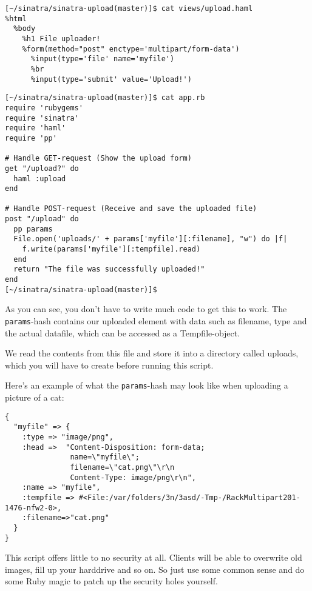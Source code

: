 \begin{verbatim}
[~/sinatra/sinatra-upload(master)]$ cat views/upload.haml 
%html
  %body
    %h1 File uploader!
    %form(method="post" enctype='multipart/form-data')   
      %input(type='file' name='myfile')    
      %br
      %input(type='submit' value='Upload!')
\end{verbatim}

\begin{verbatim}
[~/sinatra/sinatra-upload(master)]$ cat app.rb 
require 'rubygems'
require 'sinatra'
require 'haml'
require 'pp'
 
# Handle GET-request (Show the upload form)
get "/upload?" do
  haml :upload
end      
    
# Handle POST-request (Receive and save the uploaded file)
post "/upload" do 
  pp params
  File.open('uploads/' + params['myfile'][:filename], "w") do |f|
    f.write(params['myfile'][:tempfile].read)
  end
  return "The file was successfully uploaded!"
end
[~/sinatra/sinatra-upload(master)]$ 
\end{verbatim}

As you can see, you don’t have to write much code to get this to
work. The \verb|params|-hash contains our uploaded element with data such
as filename, type and the actual datafile, which can be accessed
as a Tempfile-object. 

We read the contents from this file and store
it into a directory called uploads, which you will have to create
before running this script.

Here’s an example of what the \verb|params|-hash may look like when uploading
a picture of a cat:

\begin{verbatim}
{
  "myfile" => {
    :type => "image/png",
    :head =>  "Content-Disposition: form-data;
               name=\"myfile\";
               filename=\"cat.png\"\r\n
               Content-Type: image/png\r\n",
    :name => "myfile",
    :tempfile => #<File:/var/folders/3n/3asd/-Tmp-/RackMultipart201-1476-nfw2-0>,
    :filename=>"cat.png"
  }
}  
\end{verbatim}



This script offers little to no security at all. Clients will be able to overwrite old images, fill up your harddrive and so on. So just use some common sense and do some Ruby magic to patch up the security holes yourself.

